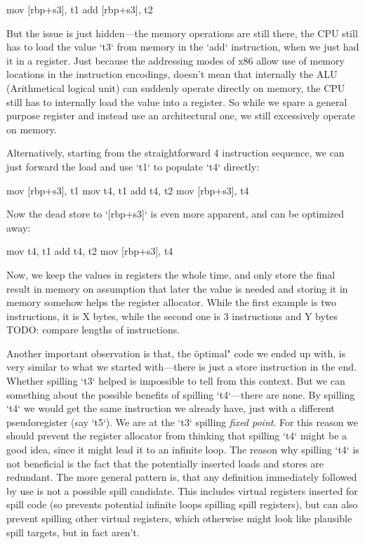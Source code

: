 \begtt
mov [rbp+s3], t1
add [rbp+s3], t2
\endtt

But the issue is just hidden---the memory operations are still
there, the CPU still has to load the value `t3` from memory in the `add`
instruction, when we just had it in a register. Just because the addressing
modes of x86 allow use of memory locations in the instruction encodings, doesn't
mean that internally the ALU (Arithmetical logical unit) can suddenly operate
directly on memory, the CPU still has to internally load the value into a
register. So while we spare a general purpose register and instead use an
architectural one, we still excessively operate on memory.

Alternatively, starting from the straightforward 4 instruction sequence, we can
just forward the load and use `t1` to populate `t4` directly:

\begtt
mov [rbp+s3], t1
mov t4, t1
add t4, t2
mov [rbp+s3], t4
\endtt

Now the dead store to `[rbp+s3]` is even more apparent, and can be optimized
away:

\begtt
mov t4, t1
add t4, t2
mov [rbp+s3], t4
\endtt

Now, we keep the values in registers the whole time, and only store the final
result in memory on assumption that later the value is needed and storing it in
memory somehow helps the register allocator. While the first example is two
instructions, it is X bytes, while the second one is 3 instructions and Y bytes
TODO: compare lengths of instructions.

Another important observation is that, the \"optimal" code we ended up with, is
very similar to what we started with---there is just a store instruction in the
end. Whether spilling `t3` helped is impossible to tell from this context. But
we can something about the possible benefits of spilling `t4`---there are none.
By spilling `t4` we would get the same instruction we already have, just with a
different pseudoregister (say `t5`). We are at the `t3` spilling {\em fixed
point}. For this reason we should prevent the register allocator from thinking
that spilling `t4` might be a good idea, since it might lead it to an infinite
loop. The reason why spilling `t4` is not beneficial is the fact that the potentially
inserted loads and stores are redundant. The more general pattern is, that any
definition immediately followed by use is not a possible spill candidate. This includes
virtual registers inserted for spill code (so prevents potential infinite loops
spilling spill registers), but can also prevent spilling other virtual
registers, which otherwise might look like plausible spill targets, but in fact
aren't.

